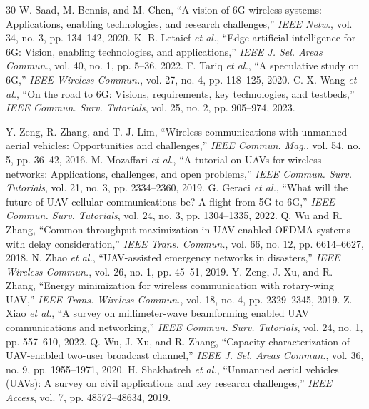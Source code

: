 \documentclass[journal]{IEEEtran}
\begin{document}
\begin{thebibliography}{30}
 W. Saad, M. Bennis, and M. Chen, ``A vision of 6G wireless systems: Applications, enabling technologies, and research challenges,'' \textit{IEEE Netw.}, vol. 34, no. 3, pp. 134--142, 2020.
 K. B. Letaief \textit{et al.}, ``Edge artificial intelligence for 6G: Vision, enabling technologies, and applications,'' \textit{IEEE J. Sel. Areas Commun.}, vol. 40, no. 1, pp. 5--36, 2022.
 F. Tariq \textit{et al.}, ``A speculative study on 6G,'' \textit{IEEE Wireless Commun.}, vol. 27, no. 4, pp. 118--125, 2020.
 C.-X. Wang \textit{et al.}, ``On the road to 6G: Visions, requirements, key technologies, and testbeds,'' \textit{IEEE Commun. Surv. Tutorials}, vol. 25, no. 2, pp. 905--974, 2023.

 Y. Zeng, R. Zhang, and T. J. Lim, ``Wireless communications with unmanned aerial vehicles: Opportunities and challenges,'' \textit{IEEE Commun. Mag.}, vol. 54, no. 5, pp. 36--42, 2016.
 M. Mozaffari \textit{et al.}, ``A tutorial on UAVs for wireless networks: Applications, challenges, and open problems,'' \textit{IEEE Commun. Surv. Tutorials}, vol. 21, no. 3, pp. 2334--2360, 2019.
 G. Geraci \textit{et al.}, ``What will the future of UAV cellular communications be? A flight from 5G to 6G,'' \textit{IEEE Commun. Surv. Tutorials}, vol. 24, no. 3, pp. 1304--1335, 2022.
 Q. Wu and R. Zhang, ``Common throughput maximization in UAV-enabled OFDMA systems with delay consideration,'' \textit{IEEE Trans. Commun.}, vol. 66, no. 12, pp. 6614--6627, 2018.
 N. Zhao \textit{et al.}, ``UAV-assisted emergency networks in disasters,'' \textit{IEEE Wireless Commun.}, vol. 26, no. 1, pp. 45--51, 2019.
 Y. Zeng, J. Xu, and R. Zhang, ``Energy minimization for wireless communication with rotary-wing UAV,'' \textit{IEEE Trans. Wireless Commun.}, vol. 18, no. 4, pp. 2329--2345, 2019.
 Z. Xiao \textit{et al.}, ``A survey on millimeter-wave beamforming enabled UAV communications and networking,'' \textit{IEEE Commun. Surv. Tutorials}, vol. 24, no. 1, pp. 557--610, 2022.
 Q. Wu, J. Xu, and R. Zhang, ``Capacity characterization of UAV-enabled two-user broadcast channel,'' \textit{IEEE J. Sel. Areas Commun.}, vol. 36, no. 9, pp. 1955--1971, 2020.
 H. Shakhatreh \textit{et al.}, ``Unmanned aerial vehicles (UAVs): A survey on civil applications and key research challenges,'' \textit{IEEE Access}, vol. 7, pp. 48572--48634, 2019.


\end{thebibliography}
\end{document}
